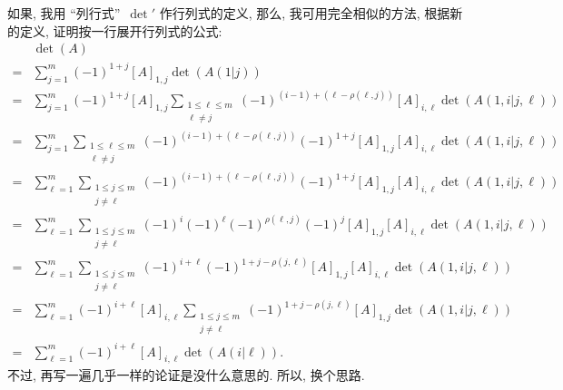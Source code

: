 \documentclass[%
    UTF8,%
    fontset=none,%
    punct=kaiming,%
    zihao=-4,%
    a4paper,%
    oneside,%
]{ctexbook}
\renewcommand*{\leq}{\leqslant}
\begin{document}
如果, 我用
``列行式''~\(\operatorname{det}'\)
作行列式的定义,
那么, 我可用完全相似的方法,
根据新的定义,
证明按一行展开行列式的公式:%
\begin{align*}
         & \det {(A)}                  \\
    = {} &
    \sum_{j = 1}^{m} {
    (-1)^{1+j} [A]_{1,j} \det {(A(1|j))}
    }
    \\
    = {} &
    \sum_{j = 1}^{m} {
    (-1)^{1+j} [A]_{1,j}
    \sum_{\substack{1 \leq \ell \leq m \\ \ell \neq j}} {
    (-1)^{(i - 1) + (\ell - \rho(\ell, j))}
        [A]_{i,\ell} \det {(A({1,i}|{j,\ell}))}
    }
    }
    \\
    = {} &
    \sum_{j = 1}^{m} {
    \sum_{\substack{1 \leq \ell \leq m \\ \ell \neq j}} {
    (-1)^{(i - 1) + (\ell - \rho(\ell, j))}
    (-1)^{1+j}
        [A]_{1,j} [A]_{i,\ell} \det {(A({1,i}|{j,\ell}))}
    }
    }
    \\
    = {} &
    \sum_{\ell = 1}^{m} {
    \sum_{\substack{1 \leq j \leq m    \\ j \neq \ell}} {
    (-1)^{(i - 1) + (\ell - \rho(\ell, j))}
    (-1)^{1+j}
        [A]_{1,j} [A]_{i,\ell} \det {(A({1,i}|{j,\ell}))}
    }
    }
    \\
    = {} &
    \sum_{\ell = 1}^{m} {
    \sum_{\substack{1 \leq j \leq m    \\ j \neq \ell}} {
    (-1)^{i} (-1)^{\ell} (-1)^{\rho(\ell, j)} (-1)^{j}
        [A]_{1,j} [A]_{i,\ell} \det {(A({1,i}|{j,\ell}))}
    }
    }
    \\
    = {} &
    \sum_{\ell = 1}^{m} {
    \sum_{\substack{1 \leq j \leq m    \\ j \neq \ell}} {
    (-1)^{i + \ell} (-1)^{1 + j - \rho(j, \ell)}
        [A]_{1,j} [A]_{i,\ell} \det {(A({1,i}|{j,\ell}))}
    }
    }
    \\
    = {} &
    \sum_{\ell = 1}^{m} {(-1)^{i + \ell} [A]_{i,\ell}
    \sum_{\substack{1 \leq j \leq m    \\ j \neq \ell}} {
    (-1)^{1 + j - \rho(j, \ell)}
        [A]_{1,j} \det {(A({1,i}|{j,\ell}))}
    }
    }
    \\
    = {} &
    \sum_{\ell = 1}^{m} {(-1)^{i + \ell} [A]_{i,\ell}
    \det {(A(i|\ell))}
    }.
\end{align*}%
不过, 再写一遍几乎一样的论证是没什么意思的.
所以, 换个思路.
\end{document}
